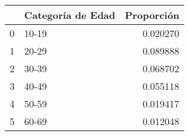 \begin{tabular}{llr}
\toprule
 & Categoría de Edad & Proporción \\
\midrule
0 & 10-19 & 0.020270 \\
1 & 20-29 & 0.089888 \\
2 & 30-39 & 0.068702 \\
3 & 40-49 & 0.055118 \\
4 & 50-59 & 0.019417 \\
5 & 60-69 & 0.012048 \\
\bottomrule
\end{tabular}
